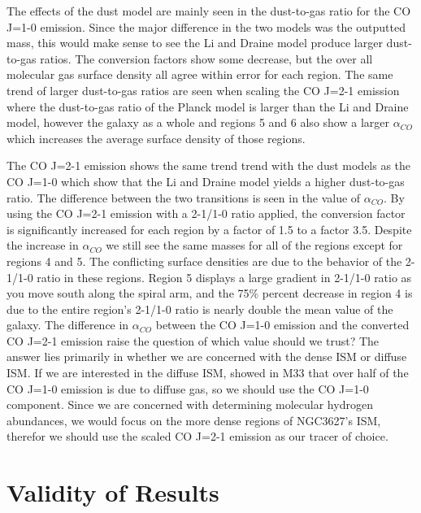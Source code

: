 The effects of the dust model are mainly seen in the dust-to-gas ratio for the CO J=1-0 emission.  Since the major difference in the two models was the outputted mass, this would make sense to see the Li and Draine model produce larger dust-to-gas ratios.  The conversion factors show some decrease, but the over all molecular gas surface density all agree within error for each region.  The same trend of larger dust-to-gas ratios are seen when scaling the CO J=2-1 emission where the dust-to-gas ratio of the Planck model is larger than the Li and Draine model, however the galaxy as a whole and regions 5 and 6 also show a larger $\alpha_{CO}$ which increases the average surface density of those regions.
  
The CO J=2-1 emission shows the same trend trend with the dust models as the CO J=1-0 which show that the Li and Draine model yields a higher dust-to-gas ratio.  The difference between the two transitions is seen in the value of $\alpha_{CO}$.  By using the CO J=2-1 emission with a 2-1/1-0 ratio applied, the conversion factor is significantly increased for each region by a factor of 1.5 to a factor 3.5.  Despite the increase in $\alpha_{CO}$ we still see the same masses for all of the regions except for regions 4 and 5.  The conflicting surface densities are due to the behavior of the 2-1/1-0 ratio in these regions.  Region 5 displays a large gradient in 2-1/1-0 ratio as you move south along the spiral arm, and the 75\% percent decrease in region 4 is due to the entire region's 2-1/1-0 ratio is nearly double the mean value of the galaxy.  The difference in $\alpha_{CO}$ between the CO J=1-0 emission and the converted CO J=2-1 emission raise the question of which value should we trust?  The answer lies primarily in whether we are concerned with the dense ISM or diffuse ISM.  If we are interested in the diffuse ISM, \cite{wilson1990} showed in M33 that over half of the CO J=1-0 emission is due to diffuse gas, so we should use the CO J=1-0 component.  Since we are concerned with determining molecular hydrogen abundances, we would focus on the more dense regions of NGC3627's ISM, therefor we should use the scaled CO J=2-1 emission as our tracer of choice.

\section{Validity of Results}

